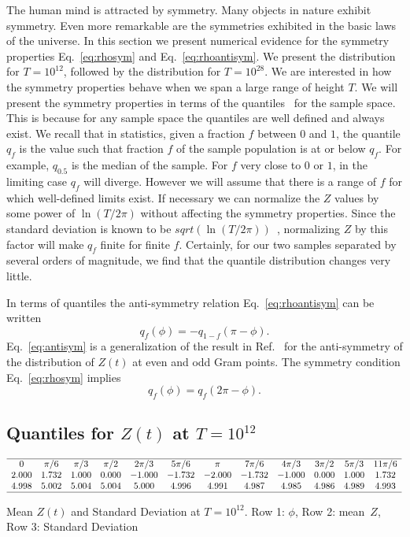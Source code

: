 \documentclass[twoside]{article}
\begin{document}
The human mind is attracted by symmetry. Many objects in nature exhibit symmetry.
Even more remarkable are the symmetries exhibited in the basic laws of the 
universe. In this section we present  numerical evidence for the symmetry properties
Eq.~\ref{eq:rhosym} and Eq.~\ref{eq:rhoantisym}. 
We  present the distribution for $T=10^{12}$, followed by the distribution for $T=10^{28}$.  
We are interested in how the symmetry properties behave when we span a large range of 
height $T$.
We will present the symmetry properties in terms of the quantiles~\cite{feller} 
for the sample space. This is because for any sample space the quantiles are well defined 
and always exist. We recall that in statistics, given a fraction $f$ between $0$ and $1$, 
the quantile $q_f$ is the value such that fraction $f$  of the sample population is 
at or below $q_f$. For example, $q_{0.5}$ is the median of the sample.
For $f$ very close to $0$ or $1$, in the limiting case $q_f$ will diverge. 
However we will assume that there is a range of $f$ for which well-defined limits exist. 
If necessary we can normalize the $Z$ values by some power of $\ln(T/2\pi)$ without 
affecting the symmetry properties. Since the standard deviation is 
known to be $sqrt(\ln(T/2\pi))$~\cite{Shanker 2018b}, 
normalizing $Z$ by this factor will make $q_f$ finite for finite $f$. 
Certainly, for our two samples separated by several orders of magnitude, 
we find that the quantile distribution changes very little. 

In terms of quantiles the anti-symmetry relation Eq.~\ref{eq:rhoantisym} 
can be written
\begin{equation}
q_{f}(\phi) = -q_{1-f}(\pi-\phi).
\label{eq:antisym}
\end{equation}
Eq.~\ref{eq:antisym}  is a generalization of the result in Ref.~\cite{Shanker 2018a} 
for the anti-symmetry of the distribution of $Z(t)$ at even and odd Gram points. 
The  symmetry condition Eq.~\ref{eq:rhosym} implies
\begin{equation}
q_{f}(\phi) = q_{f}(2\pi-\phi).
\label{eq:sym}
\end{equation}




\subsection{\label{E12}Quantiles for $Z(t)$ at $T=10^{12}$}


\begin{table}
\centering \(\begin{array}{cccccccccccc}

\hline
0&\pi/6 &\pi/3 &\pi/2 &2\pi/3 &5\pi/6 &\pi &7\pi/6 &4\pi/3 &3\pi/2 &5\pi/3 &11\pi/6 \\
2.000 &1.732 &1.000 &0.000 &-1.000 &-1.732 &-2.000 &-1.732 &-1.000 &0.000 &1.000 &1.732 \\
4.998&5.002&5.004&5.004&5.000&4.996&4.991&4.987&4.985&4.986&4.989&4.993 \\
\hline
\end{array}\)
\caption{Mean    $Z(t)$ and Standard Deviation at $T=10^{12}$. Row 1: $\phi$, Row 2: mean~$Z$, Row 3: Standard Deviation}
\label{tab:mean12}
\end{table}
\end{document}
